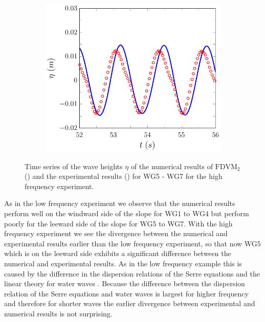 \begin{figure}
\begin{subfigure}{0.5\textwidth}
		\vspace{0.5cm}
	\end{subfigure}
	\begin{subfigure}{0.5\textwidth}
		\includegraphics[width=\textwidth]{./chp6/figures/Experiment/Beji/sh/FDVMWG7.pdf}
		\vspace{0.5cm}
	\end{subfigure}
	\caption{Time series of the wave heights $\eta$ of the numerical results of $\text{FDVM}_2$ ({\color{blue}\solidrule}) and the experimental results () for WG5 - WG7 for the high frequency experiment.}
	\label{fig:BejishWG5to7FDVM}
\end{figure}

As in the low frequency experiment we observe that the numerical results perform well on the windward side of the slope for WG1 to WG4 but perform poorly for the leeward side of the slope for WG5 to WG7. With the high frequency experiment we see the divergence between the numerical and experimental results earlier than the low frequency experiment, so that now WG5 which is on the leeward side exhibits a significant difference between the numerical and experimental results. As in the low frequency example this is caused by the difference in the dispersion relations of the Serre equations and the linear theory for water waves \cite{Beji-Battjes-1994-1,Lannes-2013}. Because the difference between the dispersion relation of the Serre equations and water waves is largest for higher frequency and therefore for shorter waves \cite{Barthelemy-2004-315} the earlier divergence between experimental and numerical results is not surprising. 

